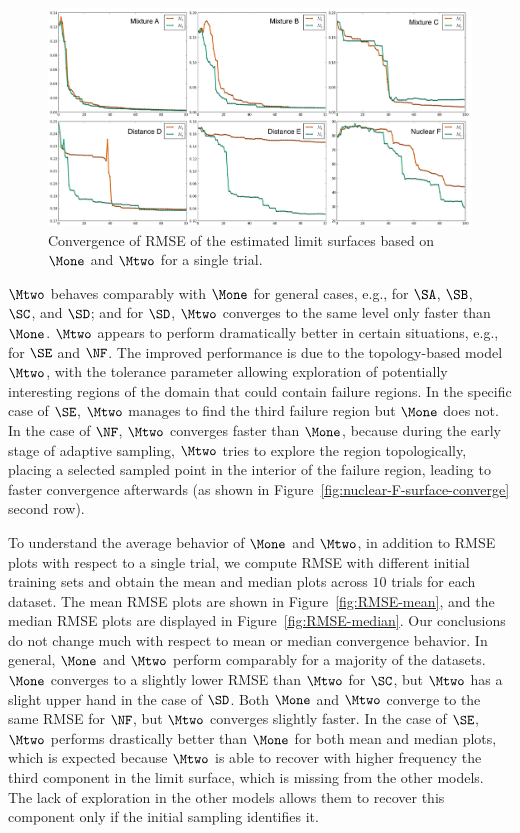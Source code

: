\begin{figure}[!b]
  \centering
  \includegraphics[width=1.0\textwidth]{figs/chap5/RMSE-convergence.pdf}
  \caption{Convergence of RMSE of the estimated limit surfaces based on $\protect\Mone$ and $\protect\Mtwo$ for a single trial.}
  \label{fig:RMSE-convergence}
  \end{figure}
  
$\Mtwo$ behaves comparably with $\Mone$ for general cases, e.g., for $\SA$, $\SB$,\\
$\SC$, and $\SD$; and for $\SD$, $\Mtwo$ converges to the same level only faster than $\Mone$.
%
$\Mtwo$ appears to perform dramatically better in certain situations, e.g., for $\SE$ and $\NF$.
%
The improved performance is due to the topology-based model $\Mtwo$, with the tolerance parameter allowing exploration of potentially interesting regions of the domain that could contain failure regions.
%
In the specific case of $\SE$, $\Mtwo$ manages to find the third failure region but $\Mone$ does not.
%
In the case of $\NF$, $\Mtwo$ converges faster than $\Mone$, because during the early stage of adaptive sampling, $\Mtwo$ tries to explore the region topologically, placing a selected sampled point in the interior of the failure region, leading to faster convergence afterwards (as shown in Figure~\ref{fig:nuclear-F-surface-converge} second row).

To understand the average behavior of $\Mone$ and $\Mtwo$, in addition to RMSE plots with respect to a single trial, we compute RMSE with different initial training sets and obtain the mean and median plots across $10$ trials for each dataset.
%
The mean RMSE plots are shown in Figure~\ref{fig:RMSE-mean}, and the median RMSE plots are displayed in Figure~\ref{fig:RMSE-median}.
%
Our conclusions do not change much with respect to mean or median convergence behavior.
%
In general, $\Mone$ and $\Mtwo$ perform comparably for a majority of the datasets.
%
$\Mone$ converges to a slightly lower RMSE than $\Mtwo$ for $\SC$, but $\Mtwo$ has a slight upper hand in the case of $\SD$.
%
Both $\Mone$ and $\Mtwo$ converge to the same RMSE for $\NF$, but $\Mtwo$ converges slightly faster.
%
In the case of $\SE$, $\Mtwo$ performs drastically better than $\Mone$ for both mean and median plots, which is expected because $\Mtwo$ is able to recover with higher frequency the third component in the limit surface, which is missing from the other models.
%
The lack of exploration in the other models allows them to recover this component only if the initial sampling identifies it.

